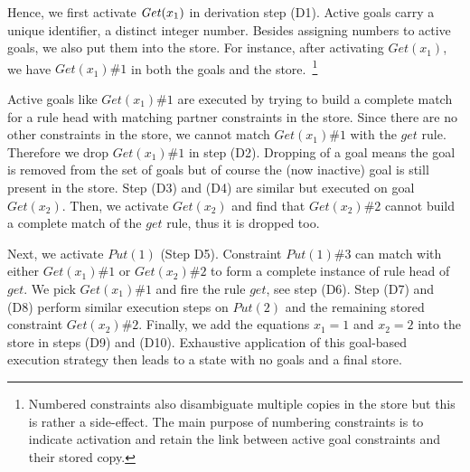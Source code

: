 \documentclass{tlp}
\begin{document}
Hence, we first activate $\mathit{Get}(x_1)$ in derivation 
step (D1). Active goals carry a unique identifier, a distinct integer 
number. Besides assigning numbers to active goals, we also put them 
into the store. For instance, after activating $Get(x_1)$, we have
$Get(x_1)\#1$
in both the goals and the store.~\footnote{Numbered constraints also 
disambiguate multiple copies in the store but this is rather a side-effect.
The main purpose of numbering constraints is to indicate activation and retain
the link between active goal constraints and their stored copy.}

Active goals like $Get(x_1)\#1$ are executed by trying to build a complete
match for a rule head with matching partner constraints in the store.
Since there are no other constraints in the store, we cannot match
$Get(x_1)\#1$ with the $get$ rule. Therefore we drop $Get(x_1)\#1$ 
in step (D2). Dropping of a goal means the goal is removed from the set 
of goals but of course the (now inactive) goal is still present in 
the store.  Step (D3) and (D4) are similar but executed on  goal $Get(x_2)$.
Then, we activate $Get(x_2)$ and find that $Get(x_2)\#2$ cannot
build a complete match of the $get$ rule, thus it is dropped too.

Next, we activate $Put(1)$ (Step D5). Constraint $Put(1)\#3$ can match with
either $Get(x_1)\#1$ or $Get(x_2)\#2$ to form a complete instance of rule head 
of $get$. We pick $Get(x_1)\#1$ and fire the rule $get$, see step (D6). 
Step (D7) and (D8) perform similar execution steps on $Put(2)$ and the remaining
stored constraint $Get(x_2)\#2$. Finally, we add the equations
$x_1=1$ and $x_2=2$ into the store in steps (D9) and (D10). Exhaustive
application of this goal-based execution strategy then leads to a
state with no goals and a final store.
\end{document}
